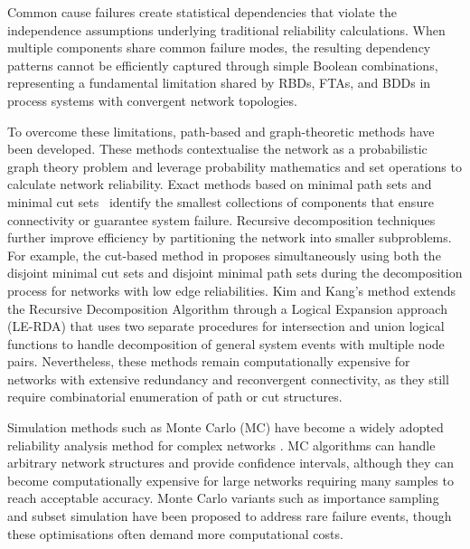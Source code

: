\documentclass[preprint,12pt]{elsarticle}
\begin{document}
Common cause failures create statistical dependencies that violate the independence assumptions underlying traditional reliability calculations\cite{mosleh_estimation_nodate}. When multiple components share common failure modes, the resulting dependency patterns cannot be efficiently captured through simple Boolean combinations, representing a fundamental limitation shared by RBDs, FTAs, and BDDs in process systems with convergent network topologies.

To overcome these limitations, path-based and graph-theoretic methods have been developed. 
These methods contextualise the network as a probabilistic graph theory problem and leverage probability mathematics and set operations to calculate network reliability.  Exact methods based on minimal path sets and minimal cut sets~\cite{kumar_composite_2018,li_cuttie_2005,billinton_network_1992, liu_improved_2012} identify the smallest collections of components that ensure connectivity or guarantee system failure. Recursive decomposition techniques further improve efficiency by partitioning the network into smaller subproblems. 
For example, the cut-based method in  \cite{liu_improved_2012} proposes simultaneously using both the disjoint minimal cut sets and disjoint minimal path sets during the decomposition process for networks with low edge reliabilities. Kim and Kang's method \cite{kim_network_2013} extends the Recursive Decomposition Algorithm through a Logical Expansion approach (LE-RDA) that uses two separate procedures for intersection and union logical functions to handle decomposition of general system events with multiple node pairs. Nevertheless, these methods remain computationally expensive for networks with extensive redundancy and reconvergent connectivity, as they still require combinatorial enumeration of path or cut structures.

Simulation methods such as Monte Carlo (MC) have become a widely adopted reliability analysis method for complex networks \cite{fishman_comparison_1986}. MC algorithms can handle arbitrary network structures and provide confidence intervals, although they can become computationally expensive for large networks requiring many samples to reach acceptable accuracy. Monte Carlo variants such as importance sampling\cite{hui_monte_2007} and subset simulation \cite{au_estimation_2001} have been proposed to address rare failure events, though these optimisations often demand more computational costs.
\end{document}
